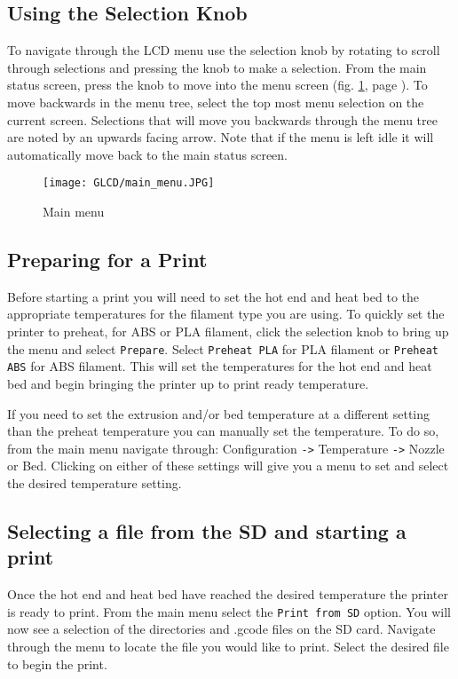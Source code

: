 \subsection{Using the Selection Knob}
To navigate through the LCD menu use the selection knob by rotating to scroll through selections and pressing the knob to make a selection. From the main status screen, press the knob to move into the menu screen (fig. \ref{fig:main_menu}, page \pageref{fig:main_menu}). To move backwards in the menu tree, select the top most menu selection on the current screen. Selections that will move you backwards through the menu tree are noted by an upwards facing arrow. Note that if the menu is left idle it will automatically move back to the main status screen.

\begin{figure}[h]
\centering
\texttt{[image: GLCD/main\_menu.JPG]}
\caption{Main menu}
\label{fig:main_menu}
\end{figure}

\subsection{Preparing for a Print}
Before starting a print you will need to set the hot end and heat bed to the appropriate temperatures for the filament type you are using. To quickly set the printer to preheat, for ABS or PLA filament, click the selection knob to bring up the menu and select \texttt{Prepare}. Select \texttt{Preheat PLA} for PLA filament or \texttt{Preheat ABS} for ABS filament. This will set the temperatures for the hot end and heat bed and begin bringing the printer up to print ready temperature.

If you need to set the extrusion and/or bed temperature at a different setting than the preheat temperature you can manually set the temperature. To do so, from the main menu navigate through: Configuration \texttt{->} Temperature \texttt{->} Nozzle or Bed. Clicking on either of these settings will give you a menu to set and select the desired temperature setting.

\subsection{Selecting a file from the SD and starting a print}
Once the hot end and heat bed have reached the desired temperature the printer is ready to print. From the main menu select the \texttt{Print from SD} option. You will now see a selection of the directories and .gcode files on the SD card. Navigate through the menu to locate the file you would like to print. Select the desired file to begin the print.

